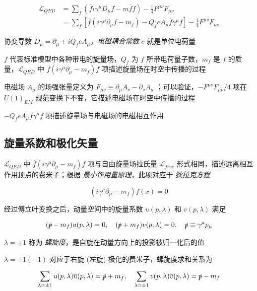 \documentclass[oneside,a4paper,openany,11pt]{ctexbook}
\begin{document}
\begin{align}
    \mathcal{L}_{QED} &= \sum_f (\overline{f} i \gamma^\mu D_\mu f - m \overline{f} f) - \frac{1}{4} F^{\mu\nu} F_{\mu\nu} \\
    &= \sum_f \left[\overline{f} (i \gamma^\mu \partial_\mu f - m_f) - Q_f e A_\mu \overline{f}\gamma^\mu f\right] - \frac{1}{4} F^{\mu\nu} F_{\mu\nu}
\end{align}

协变导数 $D_\mu = \partial_\mu + i Q_f e A_\mu$，\emph{电磁耦合常数} $e$ 就是单位电荷量

$f$ 代表标准模型中各种带电的旋量场，$Q_f$ 为 $f$ 所带电荷量子数，$m_f$ 是 $f$ 的质量，$\mathcal{L}_{QED}$ 中 $\overline{f} (i \gamma^\mu \partial_\mu - m_f) f$ 项描述旋量场在时空中传播的过程

电磁场 $A_\mu$ 的场强张量定义为 $F_{\mu\nu} \equiv \partial_\mu A_\nu - \partial_\nu A_\mu$ ；可以验证，$-F^{\mu\nu} F_{\mu\nu}/4$ 项在$U(1)_{EM}$ 规范变换下不变，它描述电磁场在时空中传播的过程

$- Q_f e A_\mu \overline{f}\gamma^\mu f$ 项描述旋量场与电磁场的电磁相互作用

\subsection{旋量系数和极化矢量}

$\mathcal{L}_{QED}$ 中 $\overline{f} (i \gamma^\mu \partial_\mu - m_f)f$ 项与自由旋量场拉氏量 $\mathcal{L}_{free}$ 形式相同，描述远离相互作用顶点的费米子；根据 \emph{最小作用量原理}，此项对应于 \emph{狄拉克方程}

\begin{equation}
    (i\gamma^\mu \partial_\mu - m_f) f(x) = 0
\end{equation}

经过傅立叶变换之后，动量空间中的旋量系数 $u(p, \lambda)$ 和 $v(p, \lambda)$ 满足

\begin{equation}
    (\slashed{p} - m_f) u(p, \lambda) = 0, \quad (\slashed{p} + m_f) v(p, \lambda) = 0, \quad \slashed{p} \equiv \gamma^\mu p_\mu
\end{equation}

$\lambda = \pm 1$ 称为 \emph{螺旋度}，是自旋在动量方向上的投影被归一化后的值

$\lambda = +1 (-1)$ 对应于右旋 (左旋) 极化的费米子，螺旋度求和关系为

\begin{equation}
    \sum_{\lambda=\pm 1} u(p, \lambda) \overline{u}(p, \lambda) = \slashed{p} + m_f, \quad \sum_{\lambda=\pm 1} v(p, \lambda) \overline{v}(p, \lambda) = \slashed{p} - m_f
\end{equation}
\end{document}
